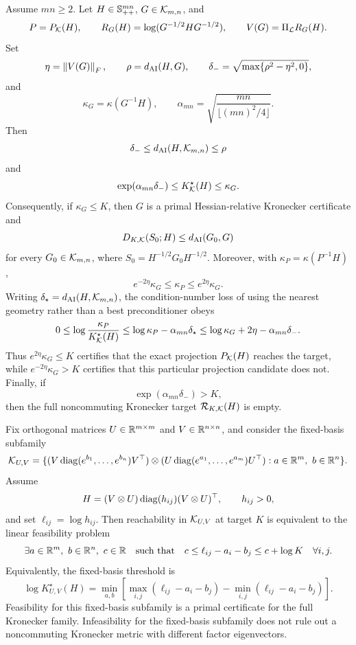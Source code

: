 \begin{theorem}
\label{thm:kron-residual-threshold}
Assume \(mn\ge2\). Let \(H\in\mathbb S_{++}^{mn}\), \(G\in\mathcal K_{m,n}\), and
\[
  P=P_{\mathcal K}(H),\qquad
  R_G(H)=\log(G^{-1/2}HG^{-1/2}),\qquad
  V(G)=\Pi_{\mathcal L}R_G(H).
\]
Set
\[
  \eta=\left\lVert V(G)\right\rVert_F,\qquad
  \rho=d_{\mathrm{AI}}(H,G),\qquad
  \delta_-=\sqrt{\max\{\rho^2-\eta^2,0\}},
\]
and
\[
  \kappa_G=\kappa(G^{-1}H),\qquad
  \alpha_{mn}=\sqrt{\frac{mn}{\lfloor (mn)^2/4\rfloor}}.
\]
Then
\[
  \delta_-
  \le d_{\mathrm{AI}}(H,\mathcal K_{m,n})
  \le \rho
\]
and
\[
  \exp(\alpha_{mn}\delta_-)
  \le K_{\mathcal K}^\star(H)
  \le \kappa_G.
\]
Consequently, if \(\kappa_G\le K\), then \(G\) is a primal
Hessian-relative Kronecker certificate and
\[
  D_{K,\mathcal K}(S_0;H)\le d_{\mathrm{AI}}(G_0,G)
\]
for every \(G_0\in\mathcal K_{m,n}\), where \(S_0=H^{-1/2}G_0H^{-1/2}\). Moreover,
with \(\kappa_P=\kappa(P^{-1}H)\),
\[
  e^{-2\eta}\kappa_G\le\kappa_P\le e^{2\eta}\kappa_G.
\]
Writing \(\delta_\star=d_{\mathrm{AI}}(H,\mathcal K_{m,n})\), the condition-number loss
of using the nearest geometry rather than a best preconditioner obeys
\[
  0
  \le
  \log\frac{\kappa_P}{K_{\mathcal K}^\star(H)}
  \le
  \log\kappa_P-\alpha_{mn}\delta_\star
  \le
  \log\kappa_G+2\eta-\alpha_{mn}\delta_-.
\]
Thus \(e^{2\eta}\kappa_G\le K\) certifies that the exact projection
\(P_{\mathcal K}(H)\) reaches the target, while \(e^{-2\eta}\kappa_G>K\) certifies
that this particular projection candidate does not. Finally, if
\[
  \exp(\alpha_{mn}\delta_-)>K,
\]
then the full noncommuting Kronecker target
\(\mathcal R_{K,\mathcal K}(H)\) is empty.
\end{theorem}

\begin{proposition}
\label{prop:kron-fixed-basis-relative}
Fix orthogonal matrices \(U\in\mathbb R^{m\times m}\) and
\(V\in\mathbb R^{n\times n}\), and consider the fixed-basis subfamily
\[
  \Kron_{U,V}
  =
  \{(V\diag(e^{b_1},\ldots,e^{b_n})V^\top)
    \otimes
    (U\diag(e^{a_1},\ldots,e^{a_m})U^\top):a\in\R^m,\ b\in\R^n\}.
\]
Assume
\[
  H=(V\otimes U)\operatorname{diag}(h_{ij})(V\otimes U)^\top,
  \qquad h_{ij}>0,
\]
and set \(\ell_{ij}=\log h_{ij}\). Then reachability in
\(\mathcal K_{U,V}\) at target \(K\) is equivalent to the linear feasibility
problem
\[
  \exists a\in\mathbb R^m,\ b\in\mathbb R^n,\ c\in\mathbb R
  \quad\text{such that}\quad
  c\le \ell_{ij}-a_i-b_j\le c+\log K
  \quad\forall i,j.
\]
Equivalently, the fixed-basis threshold is
\[
  \log K^\star_{U,V}(H)
  =
  \min_{a,b}
  \left[
  \max_{i,j}(\ell_{ij}-a_i-b_j)
  -
  \min_{i,j}(\ell_{ij}-a_i-b_j)
  \right].
\]
Feasibility for this fixed-basis subfamily is a primal certificate for the full
Kronecker family. Infeasibility for the fixed-basis subfamily does not rule out
a noncommuting Kronecker metric with different factor eigenvectors.
\end{proposition}

